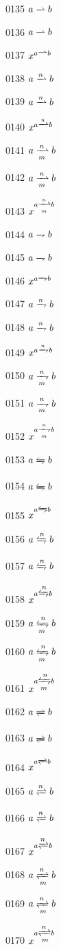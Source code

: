 \documentclass{article}
\begin{document}
0135 $a\xrightharpoonup{}b$\par
0136 $\displaystyle a\xrightharpoonup{}b$\par
0137 $x^{a\xrightharpoonup{}b}$\par
0138 $a\xrightharpoonup{n}b$\par
0139 $\displaystyle a\xrightharpoonup{n}b$\par
0140 $x^{a\xrightharpoonup{n}b}$\par
0141 $a\xrightharpoonup[m]{n}b$\par
0142 $\displaystyle a\xrightharpoonup[m]{n}b$\par
0143 $x^{a\xrightharpoonup[m]{n}b}$\par
0144 $a\xrightharpoondown{}b$\par
0145 $\displaystyle a\xrightharpoondown{}b$\par
0146 $x^{a\xrightharpoondown{}b}$\par
0147 $a\xrightharpoondown{n}b$\par
0148 $\displaystyle a\xrightharpoondown{n}b$\par
0149 $x^{a\xrightharpoondown{n}b}$\par
0150 $a\xrightharpoondown[m]{n}b$\par
0151 $\displaystyle a\xrightharpoondown[m]{n}b$\par
0152 $x^{a\xrightharpoondown[m]{n}b}$\par
0153 $a\xleftrightharpoons{}b$\par
0154 $\displaystyle a\xleftrightharpoons{}b$\par
0155 $x^{a\xleftrightharpoons{}b}$\par
0156 $a\xleftrightharpoons{n}b$\par
0157 $\displaystyle a\xleftrightharpoons{n}b$\par
0158 $x^{a\xleftrightharpoons{n}b}$\par
0159 $a\xleftrightharpoons[m]{n}b$\par
0160 $\displaystyle a\xleftrightharpoons[m]{n}b$\par
0161 $x^{a\xleftrightharpoons[m]{n}b}$\par
0162 $a\xrightleftharpoons{}b$\par
0163 $\displaystyle a\xrightleftharpoons{}b$\par
0164 $x^{a\xrightleftharpoons{}b}$\par
0165 $a\xrightleftharpoons{n}b$\par
0166 $\displaystyle a\xrightleftharpoons{n}b$\par
0167 $x^{a\xrightleftharpoons{n}b}$\par
0168 $a\xrightleftharpoons[m]{n}b$\par
0169 $\displaystyle a\xrightleftharpoons[m]{n}b$\par
0170 $x^{a\xrightleftharpoons[m]{n}b}$\par
\end{document}

